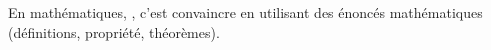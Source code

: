 En mathématiques, , c'est convaincre en utilisant des énoncés
mathématiques (définitions, propriété, théorèmes).